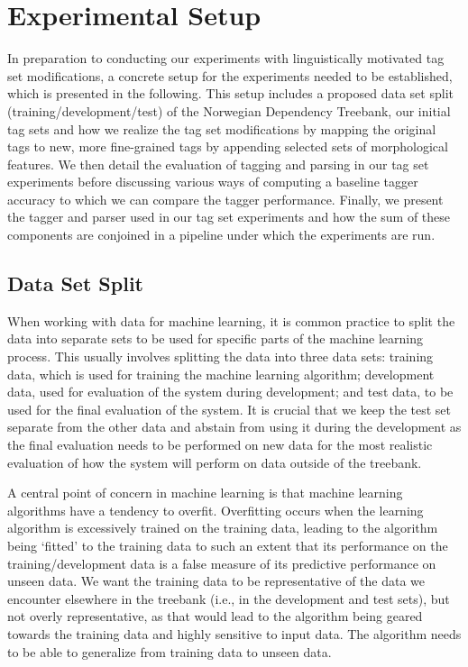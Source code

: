 \documentclass[a4paper,12pt,english]{book}
\begin{document}
\chapter{Experimental Setup}
\label{chap:expsetup}
In preparation to conducting our experiments with linguistically motivated tag
set modifications, a concrete setup for the experiments needed to be
established, which is presented in the following. This setup includes a
proposed data set split (training/development/test) of the Norwegian Dependency
Treebank, our initial tag sets and how we realize the tag set modifications by
mapping the original tags to new, more fine-grained tags by appending selected
sets of morphological features. We then detail the evaluation of tagging and
parsing in our tag set experiments before discussing various ways of computing
a baseline tagger accuracy to which we can compare the tagger performance.
Finally, we present the tagger and parser used in our tag set experiments and
how the sum of these components are conjoined in a pipeline under which the
experiments are run.

\section{Data Set Split}
When working with data for machine learning, it is common practice to split the
data into separate sets to be used for specific parts of the machine learning
process. This usually involves splitting the data into three data sets:
training data, which is used for training the machine learning algorithm;
development data, used for evaluation of the system during development; and
test data, to be used for the final evaluation of the system.  It is crucial
that we keep the test set separate from the other data and abstain from using
it during the development as the final evaluation needs to be performed on new
data for the most realistic evaluation of how the system will perform on data
outside of the treebank.

A central point of concern in machine learning is that machine learning
algorithms have a tendency to overfit. Overfitting occurs when the learning
algorithm is excessively trained on the training data, leading to the algorithm
being `fitted' to the training data to such an extent that its performance on
the training/development data is a false measure of its predictive performance
on unseen data.  We want the training data to be representative of the data we
encounter elsewhere in the treebank (i.e., in the development and test sets),
but not overly representative, as that would lead to the algorithm being geared
towards the training data and highly sensitive to input data. The algorithm
needs to be able to generalize from training data to unseen data.
\end{document}
